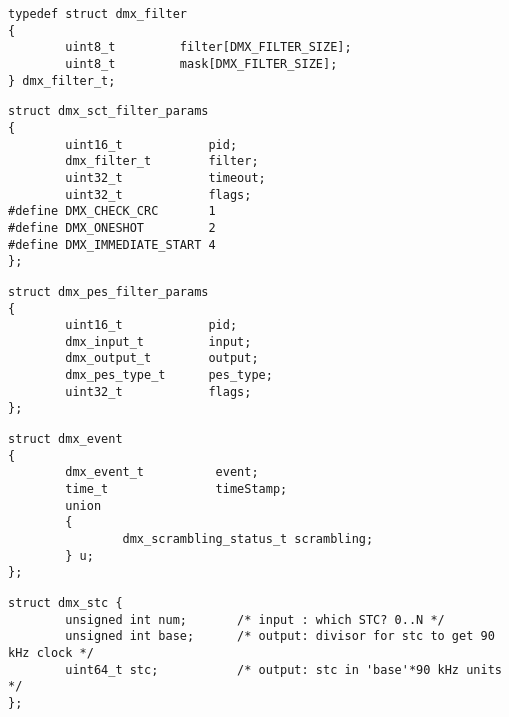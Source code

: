 \begin{verbatim}
typedef struct dmx_filter
{
        uint8_t         filter[DMX_FILTER_SIZE];
        uint8_t         mask[DMX_FILTER_SIZE];
} dmx_filter_t;
\end{verbatim}


\label{dmxsctfilterparams}

\begin{verbatim}
struct dmx_sct_filter_params
{
        uint16_t            pid;
        dmx_filter_t        filter;
        uint32_t            timeout;
        uint32_t            flags;
#define DMX_CHECK_CRC       1
#define DMX_ONESHOT         2
#define DMX_IMMEDIATE_START 4
};
\end{verbatim}


\label{dmxpesfilterparams}

\begin{verbatim}
struct dmx_pes_filter_params
{
        uint16_t            pid;
        dmx_input_t         input;
        dmx_output_t        output;
        dmx_pes_type_t      pes_type;
        uint32_t            flags;
};
\end{verbatim}


\label{dmxevent}

\begin{verbatim}
struct dmx_event
{
        dmx_event_t          event;
        time_t               timeStamp;
        union
        {
                dmx_scrambling_status_t scrambling;
        } u;
};
\end{verbatim}

\label{dmxstc}

\begin{verbatim}
struct dmx_stc {
        unsigned int num;       /* input : which STC? 0..N */
        unsigned int base;      /* output: divisor for stc to get 90 kHz clock */
        uint64_t stc;           /* output: stc in 'base'*90 kHz units */
};
\end{verbatim}

\clearpage

